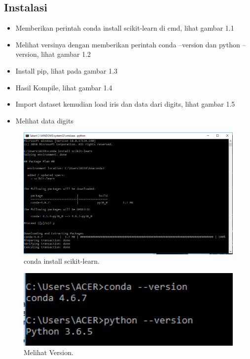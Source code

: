 \begin{enumerate}
\subsection{Instalasi}

\begin{itemize}
\item
Memberikan perintah conda install scikit-learn di cmd, lihat gambar 1.1
\item
Melihat versinya dengan memberikan perintah conda --version dan python --version, lihat gambar 1.2
\item
Install pip, lihat pada gambar 1.3
\item
Hasil Kompile, lihat gambar 1.4
\item
Import dataset kemudian load iris dan data dari digits, lihat gambar 1.5
\item
Melihat data digits
\end{itemize}

\begin{figure}[ht]\centerline{\includegraphics[width=1\textwidth]{figures/111.PNG}}\caption{conda install scikit-learn.}\end{figure}

\begin{figure}[ht]\centerline{\includegraphics[width=1\textwidth]{figures/222.PNG}}\caption{Melihat Version.}\end{figure}


\end{enumerate}
